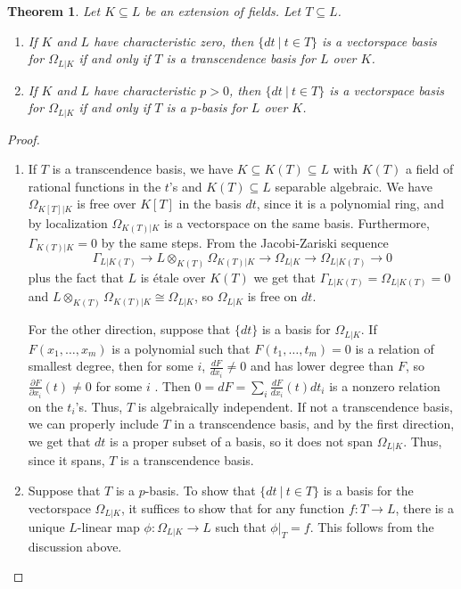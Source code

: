 \documentclass{amsart}[12pt]
\numberwithin{equation}{section}
\theoremstyle{plain} %
\newtheorem{thm}[equation]{Theorem}
\theoremstyle{definition}
\theoremstyle{remark}
\begin{document}
\begin{thm} Let $K\subseteq L$ be an extension of fields. Let $T\subseteq L$.
\begin{enumerate}
\item If $K$ and $L$ have characteristic zero, then $\{ dt \ | \ t\in T\}$ is a vectorspace basis for $\Omega_{L|K}$ if and only if $T$ is a transcendence basis for $L$ over $K$.
\item If $K$ and $L$ have characteristic $p>0$, then $\{ dt \ | \ t\in T\}$ is a vectorspace basis for $\Omega_{L|K}$ if and only if $T$ is a $p$-basis for $L$ over $K$.
\end{enumerate}
\end{thm}
\begin{proof}

\begin{enumerate}
\item If $T$ is a transcendence basis, we have $K\subseteq K(T) \subseteq L$ with $K(T)$ a field of rational functions in the $t$'s and $K(T)\subseteq L$ separable algebraic. We have $\Omega_{K[T]|K}$ is free over $K[T]$ in the basis $dt$, since it is a polynomial ring, and by localization $\Omega_{K(T)|K}$ is a vectorspace on the same basis. Furthermore, $\Gamma_{K(T)|K} = 0$ by the same steps. From the Jacobi-Zariski sequence
\[  \Gamma_{L|K(T)} \to L \otimes _{K(T)} \Omega_{K(T)|K} \to \Omega_{L|K} \to \Omega_{L|K(T)} \to 0\]
plus the fact that $L$ is \'etale over $K(T)$ we get that $\Gamma_{L|K(T)}=\Omega_{L|K(T)}=0$ and $L \otimes _{K(T)} \Omega_{K(T)|K} \cong \Omega_{L|K}$, so $\Omega_{L|K}$ is free on $dt$. 

For the other direction, suppose that $\{dt\}$ is a basis for $\Omega_{L|K}$. If $F(x_1,\dots,x_m)$ is a polynomial such that $F(t_1,\dots,t_m)=0$ is a relation of smallest degree, then for some $i$, $\frac{d F}{d x_i}\neq 0$ and has lower degree than $F$, so $\frac{\partial F}{\partial x_i}(t)\neq 0$ for some $i$ . Then $0=dF= \sum_i \frac{d F}{d x_i}(t) dt_i$ is a nonzero relation on the $t_i$'s. Thus, $T$ is algebraically independent. If not a transcendence basis, we can properly include $T$ in a transcendence basis, and by the first direction, we get that $dt$ is a proper subset of a basis, so it does not span $\Omega_{L|K}$. Thus, since it spans, $T$ is a transcendence basis.

\item Suppose that $T$ is a $p$-basis. To show that $\{dt \ | \ t\in T\}$ is a basis for the vectorspace $\Omega_{L|K}$, it suffices to show that for any function $f:T\to L$, there is a unique $L$-linear map $\phi:\Omega_{L|K} \to L$ such that $\phi|_T=f$. This follows from the discussion above.


\end{enumerate}
\end{proof}
\end{document}
